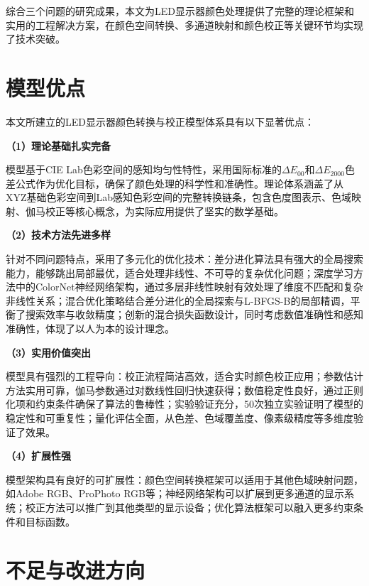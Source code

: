 综合三个问题的研究成果，本文为LED显示器颜色处理提供了完整的理论框架和实用的工程解决方案，在颜色空间转换、多通道映射和颜色校正等关键环节均实现了技术突破。

\section[\hspace{-2pt}模型优点]{{\heiti{} \hspace{-8pt}模型优点}}\label{section5: 模型优点}

本文所建立的LED显示器颜色转换与校正模型体系具有以下显著优点：

\noindent\textbf{（1）理论基础扎实完备}

模型基于CIE Lab色彩空间的感知均匀性特性，采用国际标准的$\Delta E_{00}$和$\Delta E_{2000}$色差公式作为优化目标，确保了颜色处理的科学性和准确性。理论体系涵盖了从XYZ基础色彩空间到Lab感知色彩空间的完整转换链条，包含色度图表示、色域映射、伽马校正等核心概念，为实际应用提供了坚实的数学基础。

\noindent\textbf{（2）技术方法先进多样}

针对不同问题特点，采用了多元化的优化技术：差分进化算法具有强大的全局搜索能力，能够跳出局部最优，适合处理非线性、不可导的复杂优化问题；深度学习方法中的ColorNet神经网络架构，通过多层非线性映射有效处理了维度不匹配和复杂非线性关系；混合优化策略结合差分进化的全局探索与L-BFGS-B的局部精调，平衡了搜索效率与收敛精度；创新的混合损失函数设计，同时考虑数值准确性和感知准确性，体现了以人为本的设计理念。

\noindent\textbf{（3）实用价值突出}

模型具有强烈的工程导向：校正流程简洁高效，适合实时颜色校正应用；参数估计方法实用可靠，伽马参数通过对数线性回归快速获得；数值稳定性良好，通过正则化项和约束条件确保了算法的鲁棒性；实验验证充分，50次独立实验证明了模型的稳定性和可重复性；量化评估全面，从色差、色域覆盖度、像素级精度等多维度验证了效果。

\noindent\textbf{（4）扩展性强}

模型架构具有良好的可扩展性：颜色空间转换框架可以适用于其他色域映射问题，如Adobe RGB、ProPhoto RGB等；神经网络架构可以扩展到更多通道的显示系统；校正方法可以推广到其他类型的显示设备；优化算法框架可以融入更多约束条件和目标函数。

\section[\hspace{-2pt}不足与改进方向]{{\heiti{} \hspace{-8pt}不足与改进方向}}\label{section5: 不足与改进方向}

